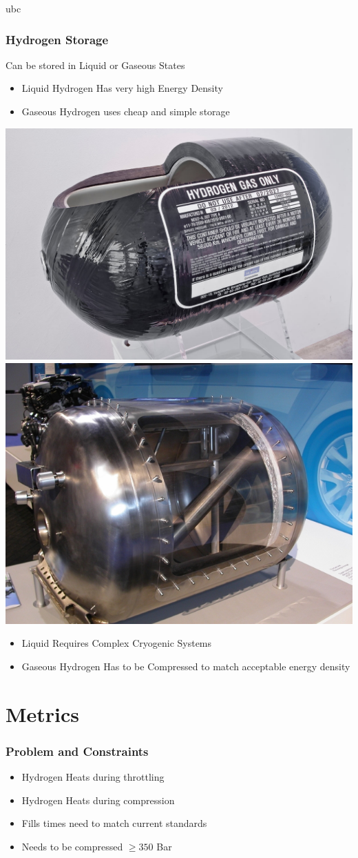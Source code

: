 \documentclass[10pt]{beamer}
\begin{document}

\begin{frame}{ubc}
\frametitle{Hydrogen Storage}
Can be stored in Liquid or Gaseous States
 

     
\begin{itemize}
\item Liquid Hydrogen Has very high Energy Density
\item Gaseous Hydrogen uses cheap and simple storage 
\end{itemize}
     \includegraphics[height=0.22\textwidth]{htank}
          \includegraphics[height=0.22\textwidth]{liq}
\begin{itemize}
\item Liquid Requires Complex Cryogenic Systems
\item Gaseous Hydrogen Has to be Compressed to match acceptable energy density 
\end{itemize}

\end{frame}


\section{Metrics}


\begin{frame}
\frametitle{Problem and Constraints}
\begin{itemize}

\item Hydrogen Heats during throttling

\item  Hydrogen Heats during compression

\item  Fills times need to match current standards

\item  Needs to be compressed $\geq350$ Bar


\end{itemize}
\end{frame}
\end{document}
